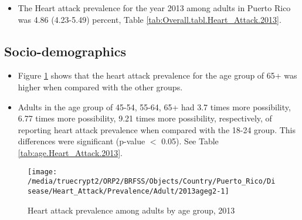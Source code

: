 \begin{itemize}


\item The Heart attack prevalence for the year 2013 among adults in Puerto Rico was 4.86 (4.23-5.49) percent, 
Table \ref{tab:Overall.tabl.Heart_Attack.2013}.

\end{itemize}



\newpage
\subsection{Socio-demographics}

\begin{itemize}

\item Figure \ref{fig:age.Heart_Attack.2013} shows that the heart attack prevalence for the age group of
65+
was higher when compared with the other groups.

\item Adults in the age group of 45-54, 55-64, 65+ had 3.7 times more possibility, 6.77 times more possibility, 9.21 times more possibility, respectively, of reporting heart attack prevalence when compared with the 18-24 group. This differences were significant (p-value $<$ 0.05). See Table \ref{tab:age.Heart_Attack.2013}.


\end{itemize}


\begin{figure}[H]
\caption{Heart attack prevalence among adults by age group, 
2013}
\begin{knitrout}
\color{fgcolor}

{\centering \texttt{[image: /media/truecrypt2/ORP2/BRFSS/Objects/Country/Puerto\_Rico/Disease/Heart\_Attack/Prevalence/Adult/2013ageg2-1]} 

}



\end{knitrout}
\label{fig:age.Heart_Attack.2013}
\end{figure}

